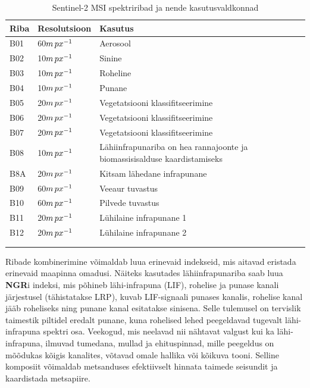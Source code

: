 \begin{longtable}{llll}
    \hline
    Riba & Resolutsioon & Kasutus                          \\ 
    \hline
    B01  & 60$m \mkern3mu px^{-1}$        & Aerosool                         \\
    B02  & 10$m \mkern3mu px^{-1}$        & Sinine                           \\
    B03  & 10$m \mkern3mu px^{-1}$        & Roheline                         \\
    B04  & 10$m \mkern3mu px^{-1}$        & Punane                           \\
    B05  & 20$m \mkern3mu px^{-1}$        & Vegetatsiooni klassifitseerimine \\
    B06  & 20$m \mkern3mu px^{-1}$        & Vegetatsiooni klassifitseerimine \\
    B07  & 20$m \mkern3mu px^{-1}$        & Vegetatsiooni klassifitseerimine \\
    B08  & 10$m \mkern3mu px^{-1}$        & Lähiinfrapunariba on hea rannajoonte ja biomassisisalduse kaardistamiseks \\
    B8A  & 20$m \mkern3mu px^{-1}$        & Kitsam lähedane infrapunane  \\
    B09  & 60$m \mkern3mu px^{-1}$        & Veeaur tuvastus                       \\
    B10  & 60$m \mkern3mu px^{-1}$        & Pilvede tuvastus                      \\
    B11  & 20$m \mkern3mu px^{-1}$        & Lühilaine infrapunane 1      \\
    B12  & 20$m \mkern3mu px^{-1}$        & Lühilaine infrapunane 2      \\
         &              &                    &                              \\ \hline
    \caption{Sentinel-2 MSI spektriribad ja nende kasutusvaldkonnad}
    \label{tab:s2bands}
\end{longtable}

Ribade kombinerimine võimaldab luua erinevaid indekseid, mis aitavad
eristada erinevaid maapinna omadusi. Näiteks kasutades lähiinfrapunariba saab luua \textbf{NGR}i indeksi, mis põhineb lähi-infrapuna (LIF), rohelise ja punase kanali järjestusel (tähistatakse LRP), kuvab LIF-signaali punases kanalis, rohelise kanal jääb roheliseks ning punane kanal esitatakse sinisena. Selle tulemusel on tervislik taimestik piltidel eredalt punane, kuna rohelised lehed peegeldavad tugevalt lähi-infrapuna spektri osa. Veekogud, mis neelavad nii nähtavat valgust kui ka lähi-infrapuna, ilmuvad tumedana, mullad ja ehituspinnad, mille peegeldus on mõõdukas kõigis kanalites, võtavad omale hallika või kõikuva tooni. Selline komposiit võimaldab metsanduses efektiivselt hinnata taimede seisundit ja kaardistada metsapiire.

